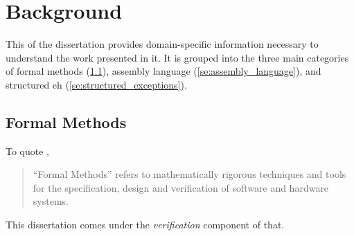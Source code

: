 \chapter{Background}\label{ch:background}
This  of the dissertation provides domain-specific information
necessary to understand the work presented in it.
It is grouped into the three main categories of
formal methods (\cref{se:formal_methods}),
assembly language (\cref{se:assembly_language}),
and structured \gls{eh} (\cref{se:structured_exceptions}).

%
%
\section{Formal Methods}\label{se:formal_methods}
To quote \textcite{butler:fm},
\begin{quote}
  ``Formal Methods''
  refers to mathematically rigorous techniques and tools
  for the specification, design and verification of software and hardware systems.
\end{quote}
This dissertation comes under the \emph{verification} component of that.%
%
%
%
%
%
